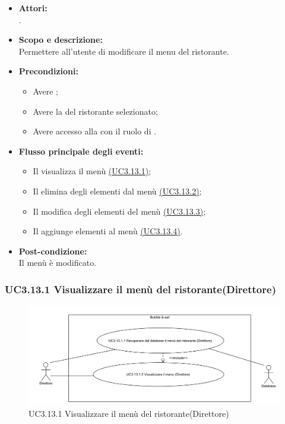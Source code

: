 \begin{itemize}
	\item \textbf{Attori:}
	\\.
	\item \textbf{Scopo e descrizione:} 
	\\Permettere all'utente  di modificare il menu del ristorante.
	\item \textbf{Precondizioni:}
	\begin{itemize}
		\item Avere ;
		\item Avere la  del ristorante selezionato;
		\item Avere accesso alla  con il ruolo di .
	\end{itemize}
	\item \textbf{Flusso principale degli eventi:}
	\begin{itemize}
		\item Il  visualizza il menù \hyperref[UC3.13.1]{(UC3.13.1)};
		\item Il  elimina degli elementi dal menù \hyperref[UC3.13.2]{(UC3.13.2)};
		\item Il  modifica degli elementi del menù \hyperref[UC3.13.3]{(UC3.13.3)};
		\item Il  aggiunge elementi al menù \hyperref[UC3.13.4]{(UC3.13.4)}.
	\end{itemize}
	\item \textbf{Post-condizione:}
	\\Il menù è modificato.
\end{itemize}

\subsubsection{UC3.13.1 Visualizzare il menù del ristorante(Direttore)} \label{UC3.13.1}

\begin{figure}[H]
	\centering
	\includegraphics[width=15cm]{../../documenti/AnalisiDeiRequisiti/Diagrammi_img/uc3_13_1.png}
	\caption{UC3.13.1 Visualizzare il menù del ristorante(Direttore)}
\end{figure}

